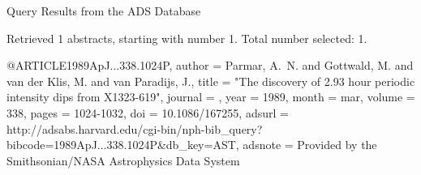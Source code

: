 Query Results from the ADS Database


Retrieved 1 abstracts, starting with number 1.  Total number selected: 1.

@ARTICLE{1989ApJ...338.1024P,
   author = {{Parmar}, A.~N. and {Gottwald}, M. and {van der Klis}, M. and 
	{van Paradijs}, J.},
    title = "{The discovery of 2.93 hour periodic intensity dips from X1323-619}",
  journal = {\apj},
     year = 1989,
    month = mar,
   volume = 338,
    pages = {1024-1032},
      doi = {10.1086/167255},
   adsurl = {http://adsabs.harvard.edu/cgi-bin/nph-bib_query?bibcode=1989ApJ...338.1024P&db_key=AST},
  adsnote = {Provided by the Smithsonian/NASA Astrophysics Data System}
}


